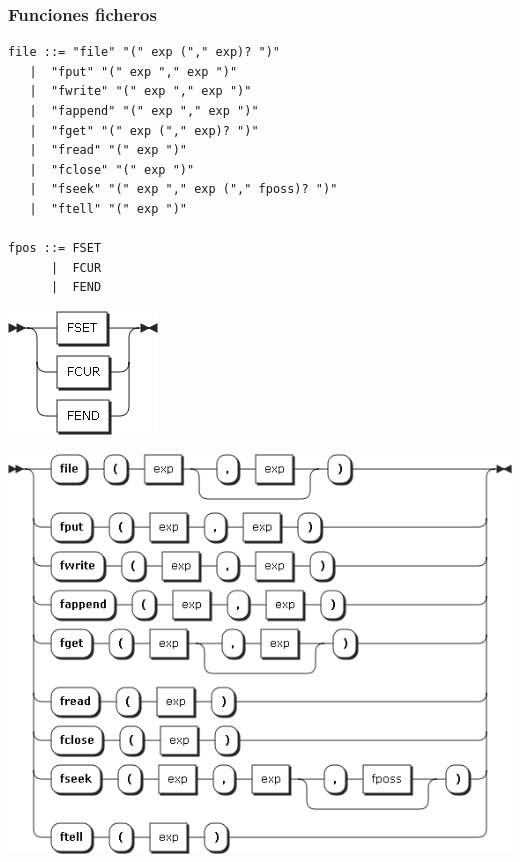 \pagebreak
\subsubsection{Funciones ficheros}
\begin{multicols}{2}
\begin{lstlisting}[style=nonumbers, basicstyle=\tiny]      
file ::= "file" "(" exp ("," exp)? ")"
   |  "fput" "(" exp "," exp ")"
   |  "fwrite" "(" exp "," exp ")"
   |  "fappend" "(" exp "," exp ")"
   |  "fget" "(" exp ("," exp)? ")"
   |  "fread" "(" exp ")"
   |  "fclose" "(" exp ")"
   |  "fseek" "(" exp "," exp ("," fposs)? ")"
   |  "ftell" "(" exp ")"

fpos ::= FSET
      |  FCUR
      |  FEND
\end{lstlisting}  
\begin{center}
\includegraphics[scale=0.4]{diagram/fpos.png} \\
\end{center}
\columnbreak	
\begin{center}
\includegraphics[scale=0.4]{diagram/file.png} \\
\end{center}

\end{multicols}

